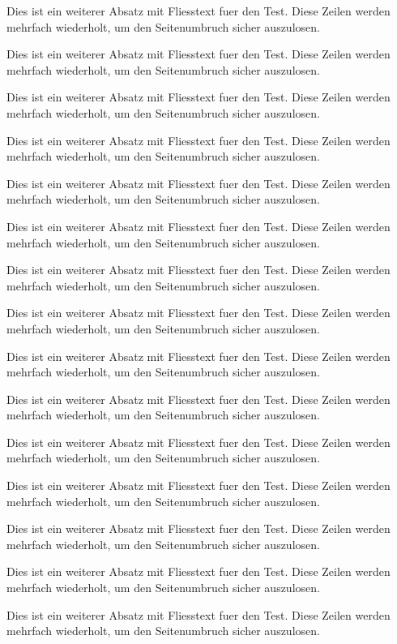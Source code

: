 \documentclass[basic]{../onlinebrief24}
\begin{document}
\begin{letter}{}
\par Dies ist ein weiterer Absatz mit Fliesstext fuer den Test. Diese Zeilen werden mehrfach wiederholt, um den Seitenumbruch sicher auszulosen.
\par Dies ist ein weiterer Absatz mit Fliesstext fuer den Test. Diese Zeilen werden mehrfach wiederholt, um den Seitenumbruch sicher auszulosen.
\par Dies ist ein weiterer Absatz mit Fliesstext fuer den Test. Diese Zeilen werden mehrfach wiederholt, um den Seitenumbruch sicher auszulosen.
\par Dies ist ein weiterer Absatz mit Fliesstext fuer den Test. Diese Zeilen werden mehrfach wiederholt, um den Seitenumbruch sicher auszulosen.
\par Dies ist ein weiterer Absatz mit Fliesstext fuer den Test. Diese Zeilen werden mehrfach wiederholt, um den Seitenumbruch sicher auszulosen.
\par Dies ist ein weiterer Absatz mit Fliesstext fuer den Test. Diese Zeilen werden mehrfach wiederholt, um den Seitenumbruch sicher auszulosen.
\par Dies ist ein weiterer Absatz mit Fliesstext fuer den Test. Diese Zeilen werden mehrfach wiederholt, um den Seitenumbruch sicher auszulosen.
\par Dies ist ein weiterer Absatz mit Fliesstext fuer den Test. Diese Zeilen werden mehrfach wiederholt, um den Seitenumbruch sicher auszulosen.
\par Dies ist ein weiterer Absatz mit Fliesstext fuer den Test. Diese Zeilen werden mehrfach wiederholt, um den Seitenumbruch sicher auszulosen.
\par Dies ist ein weiterer Absatz mit Fliesstext fuer den Test. Diese Zeilen werden mehrfach wiederholt, um den Seitenumbruch sicher auszulosen.
\par Dies ist ein weiterer Absatz mit Fliesstext fuer den Test. Diese Zeilen werden mehrfach wiederholt, um den Seitenumbruch sicher auszulosen.
\par Dies ist ein weiterer Absatz mit Fliesstext fuer den Test. Diese Zeilen werden mehrfach wiederholt, um den Seitenumbruch sicher auszulosen.
\par Dies ist ein weiterer Absatz mit Fliesstext fuer den Test. Diese Zeilen werden mehrfach wiederholt, um den Seitenumbruch sicher auszulosen.
\par Dies ist ein weiterer Absatz mit Fliesstext fuer den Test. Diese Zeilen werden mehrfach wiederholt, um den Seitenumbruch sicher auszulosen.
\par Dies ist ein weiterer Absatz mit Fliesstext fuer den Test. Diese Zeilen werden mehrfach wiederholt, um den Seitenumbruch sicher auszulosen.

\end{letter}
\end{document}
